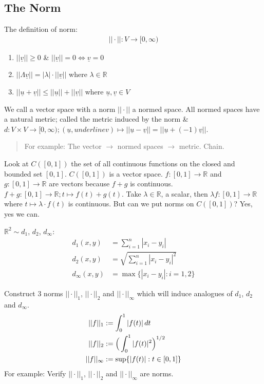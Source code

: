 \documentclass[10pt]{article}
\begin{document}
\subsection{The Norm}
The definition of norm:
\begin{align*}
    ||\cdot||:V\to[0,\infty)
\end{align*}
\begin{enumerate}[label=\textbf{N\arabic*})]
    \item $||\underline{v}||\geq0$ \& $||\underline{v}||=0\iff\underline{v}=0$
    \item $||\Lambda\underline{v}||=|\lambda|\cdot||\underline{v}||$ where $\lambda\in\mathbb{R}$
    \item $||\underline{u}+\underline{v}||\leq||\underline{u}||+||\underline{v}||$ where $\underline{u}, \underline{v}\in V$
\end{enumerate}
We call a vector space with a norm $||\cdot||$ a normed space. All normed spaces have a natural metric; called the metric induced by the norm \& $d:V\times V\to[0,\infty);(\underline{u}, underline{v})\mapsto||\underline{u}-\underline{v}||=||\underline{u}+(-1)\underline{v}||$.
\begin{quote}
    For example: The vector $\rightarrow$ normed spaces $\rightarrow$ metric. Chain.
\end{quote}

Look at $C([0,1])$ the set of all continuous functions on the closed and bounded set $[0,1]$. $C([0,1])$ is a vector space. $f:[0,1]\to\mathbb{R}$ and $g:[0,1]\to\mathbb{R}$ are vectors because $f+g$ is continuous. $f+g:[0,1]\to\mathbb{R};t\mapsto f(t)+g(t)$. Take $\lambda\in\mathbb{R}$, a  scalar, then $\lambda f:[0,1]\to\mathbb{R}$ where $t\mapsto \lambda\cdot f(t)$ is continuous. But can we put norms on $C([0,1])$? Yes, yes we can. 

$\mathbb{R}^{2}\sim d_{1}$, $d_{2}$, $d_{\infty}$:
\begin{align*}
    d_{1}(x,y)&=\sum^{n}_{i=1}|x_{i}-y_{i}|\\
    d_{2}(x,y)&=\sqrt{\sum^{n}_{i=1}|x_{i}-y_{i}|^{2}}\\
    d_{\infty}(x,y)&=\max\{|x_{i}-y_{i}|:i=1,2\}
\end{align*}

Construct 3 norms $||\cdot||_{1}$, $||\cdot||_{2}$ and $||\cdot||_{\infty}$ which will induce analogues of $d_{1}$, $d_{2}$ and $d_{\infty}$.
\begin{align*}
    ||f||_{1}&:=\int^{1}_{0}|f(t)|\,dt\\
    ||f||_{2}&:=\Big{(}\int^{1}_{0}|f(t)|^{2}\Big{)}^{1/2}\\
    ||f||_{\infty}&:=\sup\{|f(t)|:t\in[0,1]\}
\end{align*}
For example: Verify $||\cdot||_{1}$, $||\cdot||_{2}$ and $||\cdot||_{\infty}$ are norms.
\end{document}
